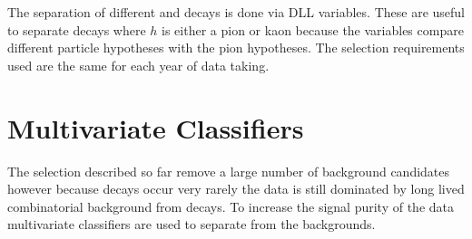 The separation of different \bdkpi and \bskk decays is done via DLL variables. These are useful to separate \bhh decays where $h$ is either a pion or kaon because the variables compare different particle hypotheses with the pion hypotheses. The selection requirements used are the same for each year of data taking.




\section{Multivariate Classifiers}
\label{sec:MVC}

The selection described so far remove a large number of background candidates however because \bsmumu decays occur very rarely the data is still dominated by long lived combinatorial background from \bbbarmumux decays. To increase the signal purity of the data multivariate classifiers are used to separate \bsmumu from the backgrounds.

